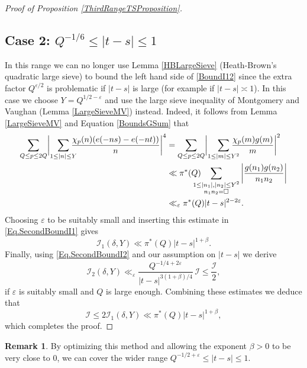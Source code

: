 \documentclass[JEP,XML,SOM,Unicode,NoFloatCountersInSection,published]{cedram}
\theoremstyle{plain}
\theoremstyle{definition}
\newtheorem{rem}[thm]{Remark}
\let\ep\varepsilon
\begin{document}
\begin{proof}[Proof of Proposition \ref{ThirdRangeTSProposition}]
\subsection*{Case 2: $Q^{-1/6}\leq|t-s|\leq 1$}
In this range we can no longer use Lemma \ref{HBLargeSieve} (Heath-Brown's quadratic large sieve) to bound the left hand side of \eqref{BoundI12} since the extra factor $Q^{\ep/2}$ is problematic if $|t-s|$ is large (for example if $|t-s|\asymp 1$). In this case we choose $Y= Q^{1/2-\ep}$ and use the large sieve inequality of Montgomery and Vaughan (Lemma \ref{LargeSieveMV}) instead. Indeed, it follows from Lemma \ref{LargeSieveMV} and Equation \eqref{BoundsGSum} that
\begin{equation}\label{BoundI13}
\begin{aligned}
\sum_{Q\leq p\leq 2Q} \biggl|\sum_{1\leq |n|\leq Y}\hspace*{-3mm} \frac{\chi_p(n) (e(-ns)-e(-nt))}{n} \biggl|^4
&= \sum_{Q\leq p\leq 2Q} \biggl|\sum_{1\leq |m|\leq Y^2}\hspace*{-4mm} \frac{\chi_p(m)g(m)}{m} \biggr|^2 \\
&\ll \pi^*(Q)\hspace*{-4mm} \sum_{\substack{1\leq |n_1|, |n_2|\leq Y^2\\ n_1n_2=\square}} \left|\frac{g(n_1)g(n_2)}{n_1n_2}\right| \\
&\ll_{\ep} \pi^*(Q)|t-s|^{2-2\ep}.
\end{aligned}
\end{equation}
Choosing $\ep$ to be suitably small and inserting this estimate in \eqref{Eq.SecondBoundI1} gives
\[
\mathcal{I}_1(\delta, Y) \ll \pi^{*}(Q)|t-s|^{1+\beta}. \]
Finally, using \eqref{Eq.SecondBoundI2} and our assumption on $|t-s|$ we derive
\[
\mathcal{I}_2(\delta, Y) \ll_{\ep} \frac{Q^{-1/4+2\ep}} {|t-s|^{3(1+\beta)/4}}\, \mathcal{I} \leq \frac{\mathcal{I}}{2}, \]
if $\ep$ is suitably small and $Q$ is large enough. Combining these estimates we deduce that
\[\mathcal{I}\leq 2 \mathcal{I}_1(\delta, Y) \ll \pi^{*}(Q)|t-s|^{1+\beta}, \]
which completes the proof.
\end{proof}

\begin{rem}\label{Rem.FinalRange}
By optimizing this method and allowing the exponent $\beta>0$ to be very close to $0$, we can cover the wider range $Q^{-1/2+\ep} \leq |t-s|\leq 1$.
\end{rem}




\end{document}
